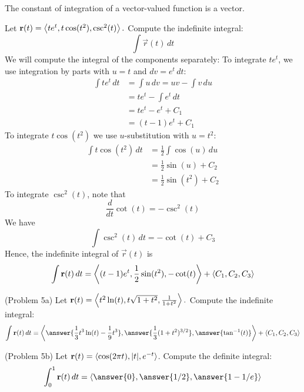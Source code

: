 \documentclass[handout]{ximera}
\begin{document}
\begin{remark}
The constant of integration of a vector-valued function is a vector.
\end{remark}

\begin{example}[Example 5]
Let $\mathbf r(t) = \left\langle te^t,t\cos(t^2),\csc^2(t)\right\rangle.$ Compute the indefinite integral:
\[
\int \vec r(t) \, dt
\]
We will compute the integral of the components separately:
To integrate $te^t$, we use integration by parts with $u = t$ and $dv = e^t \, dt$:
\begin{align*}
\int te^t \, dt &= \int u \, dv = uv - \int v \, du\\
                 &= te^t - \int e^t \, dt\\
                 & = te^t - e^t + C_1\\
                 & = (t-1)e^t + C_1
\end{align*}
To integrate $t\cos(t^2)$ we use $u$-substitution with $ u = t^2$:
\begin{align*}
\int t\cos(t^2) \, dt &= \frac12 \int \cos(u) \, du \\
                 &= \frac12 \sin(u) + C_2\\
                 & = \frac12 \sin(t^2) + C_2
\end{align*}
To integrate $\csc^2(t)$, note that
\[
\frac{d}{dt} \cot(t) = -\csc^2(t)
\]
We have
\[
\int \csc^2(t) \, dt = -\cot(t) + C_3
\]
Hence, the indefinite integral of $\vec r(t)$ is
\[
\int \mathbf r(t) \, dt = \left\langle (t-1)e^t,\frac12 \sin(t^2),-\cot(t)\right\rangle + \left\langle C_1, C_2, C_3\right\rangle
\]

\end{example}

\begin{problem}(Problem 5a)
Let $\mathbf r(t) = \left\langle t^2\ln(t),t\sqrt{1+t^2},\frac{1}{1+t^2}\right\rangle.$ Compute the indefinite integral:
\[
\int \vec r(t) \, dt = \vector{\answer{\frac13 t^3 \ln(t) - \frac19 t^3},\answer{\frac13 (1+t^2)^{3/2}},\answer{\tan^{-1}(t)}} + \vector{C_1, C_2, C_3}
\]

\end{problem}

\begin{problem}(Problem 5b)
Let $\mathbf r(t) = \left\langle \cos(2\pi t),|t|,e^{-t}\right\rangle$. Compute the definite integral:
\[
\int_0^1 \vec r(t) \, dt = \vector{\answer{0}, \answer{1/2}, \answer{1 - 1/e}}
\]
\end{problem}
\end{document}

